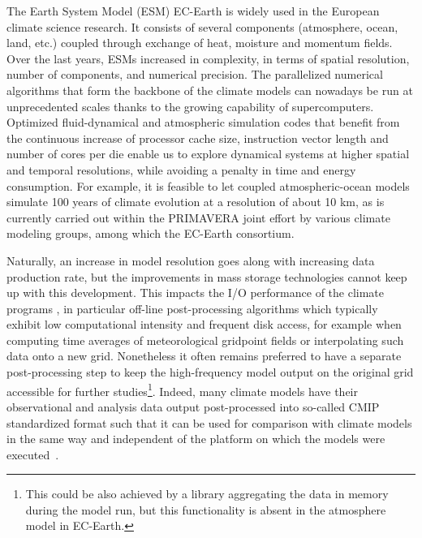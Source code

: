 \documentclass[procedia]{easychair}
\begin{document}

The Earth System Model (ESM) EC-Earth \cite{ECEARTHv22} is widely used in the 
European climate science research. It consists of several components 
(atmosphere, ocean, land, etc.) coupled through exchange of heat, moisture and 
momentum fields. Over the last years, ESMs increased in complexity, in terms of 
spatial resolution, number of components, and numerical precision. 
%
The parallelized numerical algorithms that form the backbone of the climate 
models
can nowadays be run at unprecedented scales thanks to the
growing capability of supercomputers. Optimized fluid-dynamical and atmospheric 
simulation codes that benefit from the continuous increase of processor cache 
size, instruction vector length and number of cores per die enable us to 
explore dynamical systems at higher spatial and temporal resolutions, while 
avoiding a penalty in time and energy consumption. For example, it is feasible 
to let coupled atmospheric-ocean models simulate 100 years of climate evolution 
at a resolution of about 10 km, as is currently carried out within the 
PRIMAVERA joint effort \cite{PRIMAVERA} by various climate modeling groups, 
among which the EC-Earth consortium.

Naturally, an increase in model resolution goes along with increasing data 
production rate, but the improvements in mass storage technologies cannot keep 
up with this development. This impacts the I/O performance of the climate 
programs \cite{Asif20142370}, in particular off-line post-processing algorithms 
which typically exhibit low computational intensity and frequent disk access, 
for example when computing time averages of meteorological gridpoint fields or 
interpolating such data onto a new grid.
Nonetheless it often remains preferred to have a separate post-processing step 
to keep the high-frequency model output on the original grid accessible for 
further studies\footnote{This could be also achieved by a library aggregating 
the data in memory during the model run, but this functionality is absent in 
the atmosphere model in EC-Earth.}. Indeed, many climate models have their 
observational and analysis data output post-processed into so-called CMIP 
standardized format such that it can be used for comparison with climate models 
in
the same way and independent of the platform on which the models were 
executed~\cite{CMIP6}.
 
\end{document}
